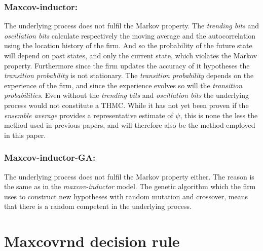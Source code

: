 \documentclass[preprint, 12pt]{elsarticle}
\begin{document}
\subsubsection*{Maxcov-inductor:}
The underlying process does not fulfil the Markov property. The \emph{trending bits} and \emph{oscillation bits} calculate respectively the moving average and the autocorrelation using the location history of the firm. And so the probability of the future state will depend on past states, and only the current state, which violates the Markov property. Furthermore since the firm updates the accuracy of it hypotheses the \emph{transition probability} is not stationary. The \emph{transition probability} depends on the experience of the firm, and since the experience evolves so will the \emph{transition probabilities}. Even without the \emph{trending bits} and \emph{oscillation bits} the underlying process would not constitute a THMC. While it has not yet been proven if the \emph{ensemble average} provides a representative estimate of $\psi$, this is none the less the method used in previous papers, and will therefore also be the method employed in this paper.

\subsubsection*{Maxcov-inductor-GA:}
The underlying process does not fulfil the Markov property either. The reason is the same as in the \emph{maxcov-inductor} model. The genetic algorithm which the firm uses to construct new hypotheses with random mutation and crossover, means that there is a random competent in the underlying process.

\section{Maxcovrnd decision rule}
\label{app:maxcovrnd}
\end{document}
